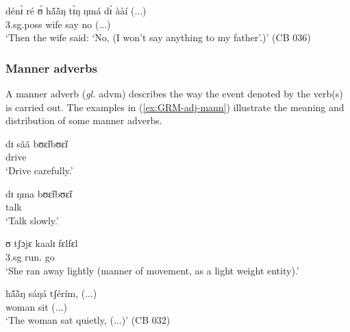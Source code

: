 \begin{exe}
\ex\label{ex:GRM-adj-temp-thereupon}
\gll dénɪ̀      ré           ʊ̀             	hã́ã̀ŋ 	tɪ̀ŋ 
ŋmá 	dɪ́   	ààí (...) \\
 {\advt} 	{\foc}     {\sc 3.sg.poss}	wife   	{\art}	say 	{\comp} 
no    (...)\\
  `Then the wife said: `No, (I won't
say
anything to my father'.)' (CB 036)
\end{exe}



\subsubsection{Manner adverbs}
\label{sec:GRM-manner-adv}

A manner adverb  ({\it gl.} {\sc advm}) describes the way the event denoted by
the verb(s) is carried out. The examples in (\ref{ex:GRM-adj-mann}) illustrate
the meaning and distribution of some manner  adverbs.


\begin{exe}
\ex\label{ex:GRM-adj-mann}
\begin{xlist}

\ex\label{ex:GRM-adj-mann-carefully}
\gll dɪ sãã bʊɛ̃ɪbʊɛ̃ɪ \\
{\comp} drive {\advm}\\
\glt `Drive carefully.'

\ex\label{ex:GRM-adj-mann-slowly}
\gll dɪ ŋma bʊɛ̃ɪbʊɛ̃ɪ\\
{\comp} talk {\advm}\\
\glt `Talk slowly.'

\ex\label{ex:GRM-adj-mann-lighly}
\gll ʊ tʃɔjɛ kaalɪ fɛlfɛl\\
 {\sc 3.sg} run.{\pfv} go {\advm} \\
\glt `She ran away lightly (manner of movement, as a light weight
entity).'

\ex\label{ex:GRM-adj-mann-silently}
\gll  	hã́ã̀ŋ 	  sáŋá 	tʃérím, (...) \\
woman   sit  	{\advm} (...)\\
\glt `The woman sat quietly,  (...)' (CB 032)

\end{xlist}
\end{exe}

